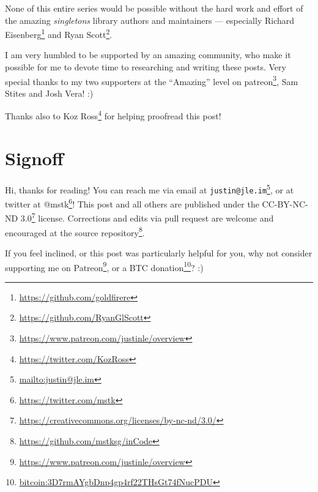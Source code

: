 \documentclass[]{article}
\renewcommand{\href}[2]{#2\footnote{\url{#1}}}
\begin{document}
None of this entire series would be possible without the hard work and effort of
the amazing \emph{singletons} library authors and maintainers --- especially
\href{https://github.com/goldfirere}{Richard Eisenberg} and
\href{https://github.com/RyanGlScott}{Ryan Scott}.

I am very humbled to be supported by an amazing community, who make it possible
for me to devote time to researching and writing these posts. Very special
thanks to my two supporters at the ``Amazing'' level on
\href{https://www.patreon.com/justinle/overview}{patreon}, Sam Stites and Josh
Vera! :)

Thanks also to \href{https://twitter.com/KozRoss}{Koz Ross} for helping
proofread this post!

\hypertarget{signoff}{%
\section{Signoff}\label{signoff}}

Hi, thanks for reading! You can reach me via email at
\href{mailto:justin@jle.im}{\nolinkurl{justin@jle.im}}, or at twitter at
\href{https://twitter.com/mstk}{@mstk}! This post and all others are published
under the \href{https://creativecommons.org/licenses/by-nc-nd/3.0/}{CC-BY-NC-ND
3.0} license. Corrections and edits via pull request are welcome and encouraged
at \href{https://github.com/mstksg/inCode}{the source repository}.

If you feel inclined, or this post was particularly helpful for you, why not
consider \href{https://www.patreon.com/justinle/overview}{supporting me on
Patreon}, or a \href{bitcoin:3D7rmAYgbDnp4gp4rf22THsGt74fNucPDU}{BTC donation}?
:)
\end{document}
